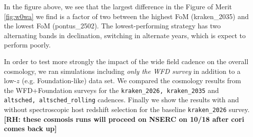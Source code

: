 In the figure above, we see that the largest difference in the Figure of Merit \ref{fig:w0wa} we find is a factor of two between the highest FoM (kraken\_2035) and the lowest FoM (pontus\_2502). The lowest-performing strategy has two alternating bands in declination, switching in alternate years, which is expect to perform poorly. 

In order to test more strongly the impact of the wide field cadence on the overall cosmology, we ran simulations including \textit{only the WFD survey} in addition to a low-$z$ (e.g. Foundation-like) data set. We compared the cosmology results from the WFD+Foundation surveys for the {\tt kraken\_2026, kraken\_2035} and {\tt altsched, altsched\_rolling} cadences. Finally we show the results with and without spectroscopic host redshift selection for the baseline {\tt kraken\_2026} survey. \textbf{[RH: these cosmosis runs will proceed on NSERC on 10/18 after cori comes back up]}


